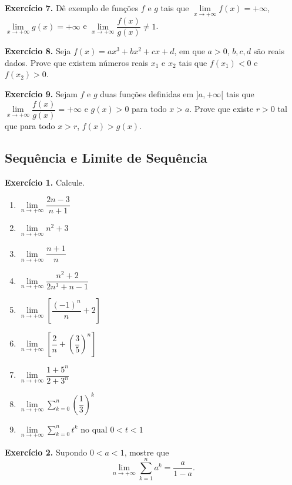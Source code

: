 \documentclass[12pt,a4paper]{article}
\begin{document}
\vspace{0.5cm}
\noindent\textbf{Exercício 7.}
Dê exemplo de funções $f$ e $g$ tais que $\lim\limits_{x \to +\infty} f(x) = +\infty$, $\lim\limits_{x \to +\infty} g(x) = +\infty$ e $\lim\limits_{x \to +\infty} \dfrac{f(x)}{g(x)} \neq 1$.

\vspace{0.5cm}
\noindent\textbf{Exercício 8.}
Seja $f(x) = ax^3 + bx^2 + cx + d$, em que $a > 0$, $b, c, d$ são reais dados. Prove que existem números reais $x_1$ e $x_2$ tais que $f(x_1) < 0$ e $f(x_2) > 0$.

\vspace{0.5cm}
\noindent\textbf{Exercício 9.}
Sejam $f$ e $g$ duas funções definidas em $]a, +\infty[$ tais que $\lim\limits_{x \to +\infty} \dfrac{f(x)}{g(x)} = +\infty$ e $g(x) > 0$ para todo $x > a$. Prove que existe $r > 0$ tal que para todo $x > r$, $f(x) > g(x)$.

\subsection{Sequência e Limite de Sequência}
\vspace{0.5cm}
\noindent\textbf{Exercício 1.} Calcule.
\begin{enumerate}
    \renewcommand{\theenumi}{\alph{enumi}}
    \renewcommand{\labelenumi}{\theenumi)}
    \item $\lim\limits_{n \to +\infty} \dfrac{2n - 3}{n + 1}$
    \item $\lim\limits_{n \to +\infty} n^2 + 3$
    \item $\lim\limits_{n \to +\infty} \dfrac{n + 1}{n}$
    \item $\lim\limits_{n \to +\infty} \dfrac{n^2 + 2}{2n^3 + n - 1}$
    \item $\lim\limits_{n \to +\infty} \left[\dfrac{(-1)^n}{n} + 2\right]$
    \item $\lim\limits_{n \to +\infty} \left[\dfrac{2}{n} + \left(\dfrac{3}{5}\right)^{\!n}\right]$
    \item $\lim\limits_{n \to +\infty} \dfrac{1 + 5^n}{2 + 3^n}$
    \item $\lim\limits_{n \to +\infty} \sum_{k = 0}^{n} \left(\dfrac{1}{3}\right)^{\!k}$
    \item $\lim\limits_{n \to +\infty} \sum_{k = 0}^{n} t^k$ no qual $0 < t < 1$
\end{enumerate}

\vspace{0.5cm}
\noindent\textbf{Exercício 2.}
Supondo $0 < a < 1$, mostre que
\[
\lim_{n \to +\infty} \sum_{k = 1}^{n} a^k = \dfrac{a}{1 - a}.
\]
\end{document}

